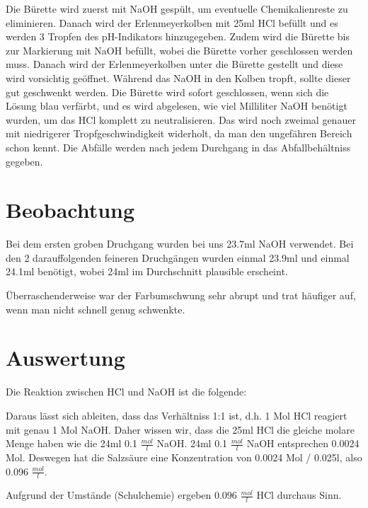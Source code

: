 \documentclass[8pt, letterpaper]{article}
\newcommand{\mpl}[1]{#1 \(\frac{mol}{l}\)}
\begin{document}
Die Bürette wird zuerst mit NaOH gespült, um eventuelle Chemikalienreste zu eliminieren.
Danach wird der Erlenmeyerkolben mit 25ml HCl befüllt und es werden 3 Tropfen des pH-Indikators hinzugegeben.
Zudem wird die Bürette bis zur Markierung mit NaOH befüllt, wobei die Bürette vorher geschlossen werden muss.
Danach wird der Erlenmeyerkolben unter die Bürette gestellt und diese wird vorsichtig geöffnet. Während das NaOH in den Kolben tropft, sollte dieser gut geschwenkt werden.
Die Bürette wird sofort geschlossen, wenn sich die Lösung blau verfärbt, und es wird abgelesen, wie viel Milliliter NaOH benötigt wurden, um das HCl komplett zu neutralisieren.
Das wird noch zweimal genauer mit niedrigerer Tropfgeschwindigkeit widerholt, da man den ungefähren Bereich schon kennt.
Die Abfälle werden nach jedem Durchgang in das Abfallbehältniss gegeben.

\section{Beobachtung}
Bei dem ersten groben Druchgang wurden bei uns 23.7ml NaOH verwendet. Bei den 2 darauffolgenden feineren Druchgängen wurden einmal 23.9ml und einmal 24.1ml benötigt, wobei 24ml im Durchschnitt plausible erscheint.

Überraschenderweise war der Farbumschwung sehr abrupt und trat häufiger auf, wenn man nicht schnell genug schwenkte.

\section{Auswertung}
Die Reaktion zwischen HCl und NaOH ist die folgende:

Daraus lässt sich ableiten, dass das Verhältniss 1:1 ist, d.h. 1 Mol HCl reagiert mit genau 1 Mol NaOH.
Daher wissen wir, dass die 25ml HCl die gleiche molare Menge haben wie die 24ml \mpl{0.1} NaOH.
24ml \mpl{0.1} NaOH entsprechen 0.0024 Mol.
Deswegen hat die Salzsäure eine Konzentration von 0.0024 Mol / 0.025l, also \mpl{0.096}.

Aufgrund der Umstände (Schulchemie) ergeben \mpl{0.096} HCl durchaus Sinn.
\end{document}
